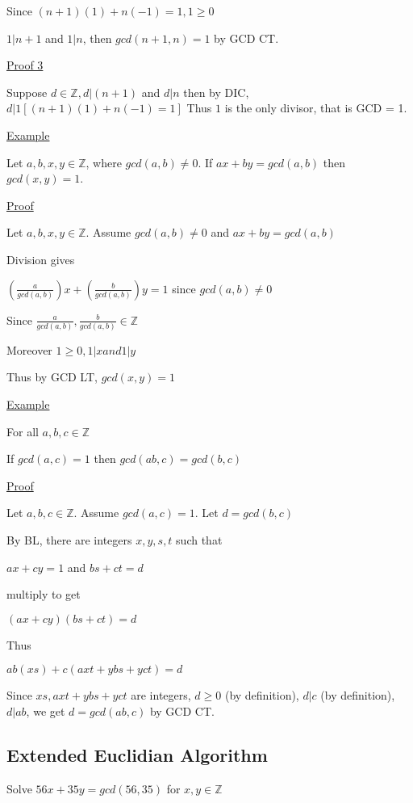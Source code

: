 \documentclass{article}
\begin{document}
Since $(n+1)(1) + n(-1) = 1, 1 \ge 0$

$1 \vert n+1$ and $1 \vert n$, then $gcd(n+1, n) = 1$ by GCD CT. 

\underline{Proof 3}

Suppose $d \in \mathbb{Z}, d \vert (n+1)$ and $d \vert n$ then by DIC, $d \vert 1 [(n+1)(1)+n(-1) = 1]$ Thus $1$ is the only divisor, that is GCD = 1. 

\underline{Example}

Let $a,b,x,y \in \mathbb{Z}$, where $gcd(a,b) \ne 0$. If $ax + by = gcd(a,b)$ then $gcd(x,y) = 1$.

\underline{Proof}

Let $a,b,x,y \in \mathbb{Z}$. Assume $gcd(a,b) \ne 0$ and $ax + by = gcd(a,b)$

Division gives 

$(\frac{a}{gcd(a,b)})x + (\frac{b}{gcd(a,b)})y = 1$ since $gcd(a,b) \ne 0$

Since $\frac{a}{gcd(a,b)}, \frac{b}{gcd(a,b)} \in \mathbb{Z}$

Moreover $1 \ge 0, 1 \vert x and 1 \vert y$

Thus by GCD LT, $gcd(x,y)=1$

\underline{Example}

For all $a,b,c \in \mathbb{Z}$

If $gcd(a,c)=1$ then $gcd(ab,c) = gcd(b,c)$

\underline{Proof}

Let $a,b,c \in \mathbb{Z}$. Assume $gcd(a,c)=1$. Let $d = gcd(b,c)$

By BL, there are integers $x,y,s,t$ such that 

$ax + cy = 1$ and $bs + ct = d$

multiply to get 

$(ax + cy)(bs + ct) = d$

Thus 

$ab(xs) + c(axt + ybs + yct) = d$

Since $xs, axt + ybs + yct$ are integers, $d \ge 0$ (by definition), $d \vert c$ (by definition), $d \vert ab$, we get $d = gcd(ab,c)$ by GCD CT.

\subsection{Extended Euclidian Algorithm}

Solve $56x + 35y = gcd(56,35)$ for $x,y \in \mathbb{Z}$
\end{document}

